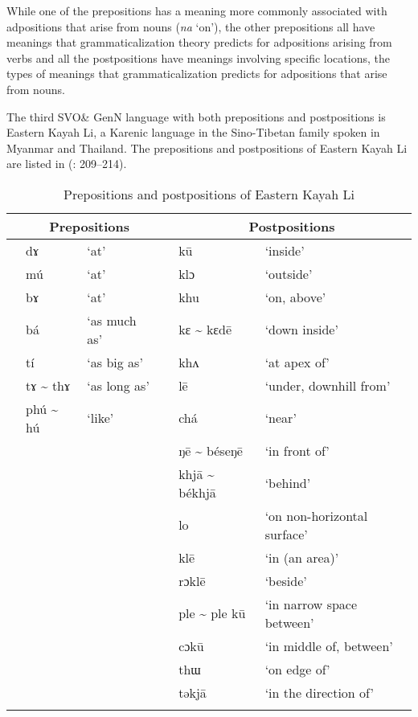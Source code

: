 \documentclass[output=paper]{langsci/langscibook}
\begin{document}
While one of the prepositions has a meaning more commonly associated with adpositions that arise from nouns (\textit{na} ‘on’), the other prepositions all have meanings that grammaticalization theory predicts for adpositions arising from verbs and all the postpositions have meanings involving specific locations, the types of meanings that grammaticalization predicts for adpositions that arise from nouns.

The third SVO\& GenN language with both prepositions and postpositions is Eastern Kayah Li, a Karenic language in the Sino-Tibetan family spoken in Myanmar and Thailand. The prepositions and postpositions of Eastern Kayah Li are listed in  (\citealt{Solnit1997}: 209–214).

\begin{table}
\caption{Prepositions and postpositions of Eastern Kayah Li}
\label{extab:dryer:22}
\begin{tabularx}{\textwidth}{lll@{}lll}
\lsptoprule
  & \multicolumn{2}{c}{\bfseries Prepositions} &  & \multicolumn{2}{c}{\bfseries Postpositions}\\
\midrule
 & dɤ & ‘at’ &  & kū & ‘inside’\\
 & mú & ‘at’ &  & klɔ & ‘outside’\\
 & bɤ & ‘at’ &  & khu & ‘on, above’\\
 & bá & ‘as much as’ &  & kɛ {\textasciitilde} kɛdē & ‘down inside’\\
 & tí & ‘as big as’ &  & khʌ & ‘at apex of’\\
 & tɤ {\textasciitilde} thɤ & ‘as long as’ &  & lē & ‘under, downhill from’\\
 & phú {\textasciitilde} hú & ‘like’ &  & chá & ‘near’\\
 &  &  &  & ŋē {\textasciitilde} béseŋē & ‘in front of’\\
 &  &  &  & khjā {\textasciitilde} békhjā & ‘behind’\\
 &  &  &  & lo & ‘on non-horizontal surface’\\
 &  &  &  & klē & ‘in (an area)’\\
 &  &  &  & rɔklē & ‘beside’\\
 &  &  &  & ple {\textasciitilde} ple kū & ‘in narrow space between’\\
 &  &  &  & cɔkū & ‘in middle of, between’\\
 &  &  &  & thɯ & ‘on edge of’\\
 &  &  &  & təkjā & ‘in the direction of’\\
\lspbottomrule
\end{tabularx}
\end{table}
\end{document}
